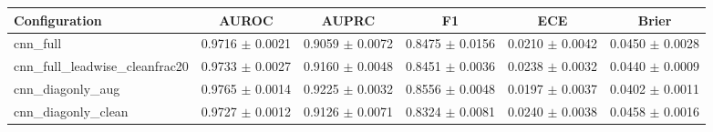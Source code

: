 \begin{tabular}{lccccc}
\toprule
Configuration & AUROC & AUPRC & F1 & ECE & Brier \\
\midrule
cnn\_full & 0.9716 $\pm$ 0.0021 & 0.9059 $\pm$ 0.0072 & 0.8475 $\pm$ 0.0156 & 0.0210 $\pm$ 0.0042 & 0.0450 $\pm$ 0.0028 \\
cnn\_full\_leadwise\_cleanfrac20 & 0.9733 $\pm$ 0.0027 & 0.9160 $\pm$ 0.0048 & 0.8451 $\pm$ 0.0036 & 0.0238 $\pm$ 0.0032 & 0.0440 $\pm$ 0.0009 \\
cnn\_diagonly\_aug & 0.9765 $\pm$ 0.0014 & 0.9225 $\pm$ 0.0032 & 0.8556 $\pm$ 0.0048 & 0.0197 $\pm$ 0.0037 & 0.0402 $\pm$ 0.0011 \\
cnn\_diagonly\_clean & 0.9727 $\pm$ 0.0012 & 0.9126 $\pm$ 0.0071 & 0.8324 $\pm$ 0.0081 & 0.0240 $\pm$ 0.0038 & 0.0458 $\pm$ 0.0016 \\
\bottomrule
\end{tabular}
